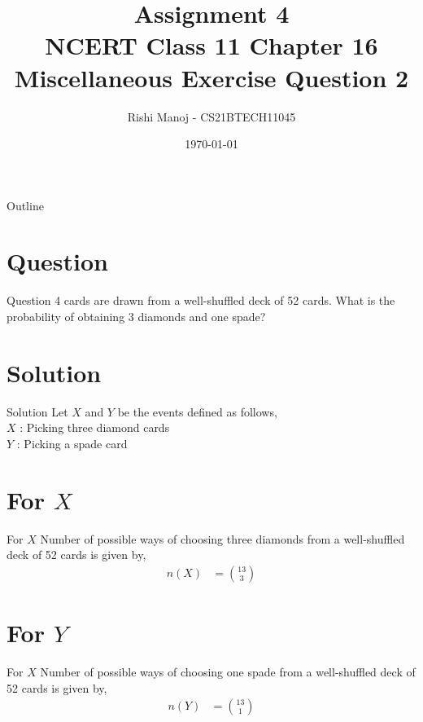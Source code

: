\documentclass{beamer}
\title{Assignment 4 \\ NCERT Class 11 Chapter 16 Miscellaneous Exercise Question 2}
\author{Rishi Manoj - CS21BTECH11045}
\date{\today}
\begin{document}
\begin{frame}
    \titlepage 
\end{frame}

\logo{}


\begin{frame}{Outline}
    \tableofcontents
\end{frame}


\section{Question}
\begin{frame}{Question}
4 cards are drawn from a well-shuffled deck of 52 cards. What is the probability of obtaining 3 diamonds and one spade?
\end{frame}


\section{Solution}
\begin{frame}{Solution}
Let $X$ and $Y$ be the events defined as follows,\\
	$X$ : Picking three diamond cards \\
	$Y$ : Picking a spade card
\end{frame}

\section{For $X$}
\begin{frame}{For $X$}
Number of possible ways of choosing three diamonds from a well-shuffled deck of 52 cards is given by,
   \begin{align}
        n(X) &= {13 \choose 3}
   \end{align}
\end{frame}
 
\section{For $Y$}
\begin{frame}{For $X$}
Number of possible ways of choosing one spade from a well-shuffled deck of 52 cards is given by,
   \begin{align}
        n(Y) &= {13 \choose 1}
   \end{align}
\end{frame}   
\end{document}
